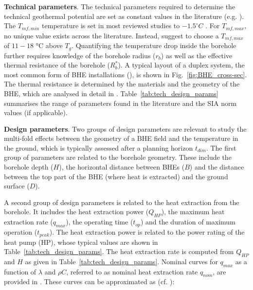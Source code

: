 \textbf{Technical parameters}. The technical parameters required to determine the technical geothermal potential are set as constant values in the literature (e.g. \cite{miglani_methodology_2018,rivera_increased_2017,zhang_critical_2017}). The $T_\mathit{mf,min}$ temperature is set in most reviewed studies to $-1.5^\circ C$ \citet{sia_sondes_2010}.
For $T_\mathit{mf,max}$, no unique value exists across the literature. Instead, \citet{kavanaugh_geothermal_2014} suggest to choose a $T_\mathit{mf,max}$ of $11 - 18$ °C above $T_g$.
Quantifying the temperature drop inside the borehole further requires knowledge of the borehole radius ($r_b$) as well as the effective thermal resistance of the borehole ($R_b^*$). A typical layout of a duplex system, the most common form of BHE installations (\cite{sia_sondes_2010}), is shown in Fig.~\ref{fig:BHE_cross-sec}. The thermal resistance is determined by the materials and the geometry of the BHE, which are analysed in detail in \citep{huber_erdwarmesonden_2005}. Table~\ref{tab:tech_design_params} summarises the range of parameters found in the literature and the SIA norm values (if applicable).

\textbf{Design parameters}. Two groups of design parameters are relevant to study the multi-fold effects between the geometry of a BHE field and the temperature in the ground, which is typically assessed after a planning horizon $t_\mathit{dim}$. 
The first group of parameters are related to the borehole geometry. These include the borehole depth ($H$), the horizontal distance between BHEs ($B$) and the distance between the top part of the BHE (where heat is extracted) and the ground surface ($D$). 

A second group of design parameters is related to the heat extraction from the borehole. It includes the heat extraction power ($Q_{HP}$), the maximum heat extraction rate ($q_\mathit{max}$), the operating time ($t_{op}$) and the duration of maximum operation ($t_{peak}$). The heat extraction power is related to the power rating of the heat pump (HP), whose typical values are shown in Table~\ref{tab:tech_design_params}. 
The heat extraction rate is computed from $Q_{HP}$ and $H$ as given in Table~\ref{tab:tech_design_params}. Nominal curves for $q_\mathit{max}$ as a function of $\lambda$ and $\rho C$, referred to as nominal heat extraction rate $q_{nom}$, are provided in \cite{sia_sondes_2010}. These curves can be approximated as (cf. \cite{sia_sondes_2010}):

